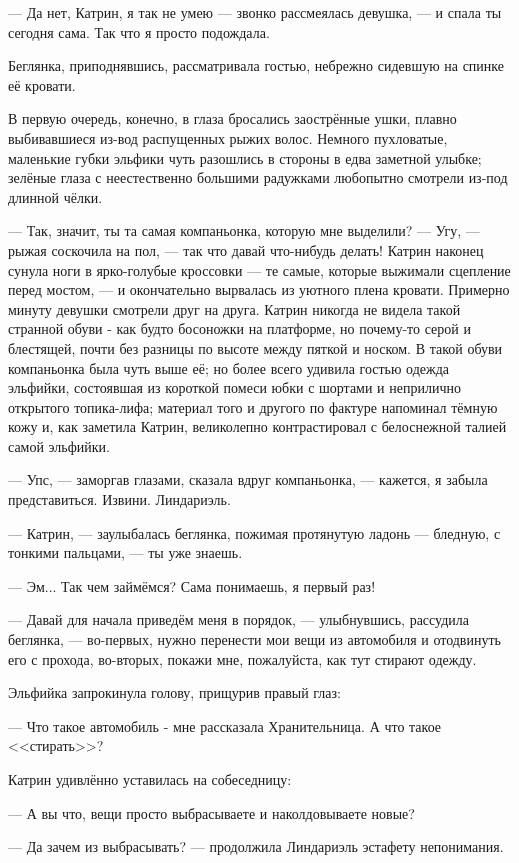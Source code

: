 --- Да нет, Катрин, я так не умею --- звонко рассмеялась девушка, --- и спала ты сегодня сама. Так что я просто подождала.

Беглянка, приподнявшись, рассматривала гостью, небрежно сидевшую на спинке её кровати.

В первую очередь, конечно, в глаза бросались заострённые ушки, плавно выбивавшиеся из-вод распущенных рыжих волос.
Немного пухловатые, маленькие губки эльфики чуть разошлись в стороны в едва заметной улыбке;
зелёные глаза с неестественно большими радужками любопытно смотрели из-под длинной чёлки.

--- Так, значит, ты та самая компаньонка, которую мне выделили?
--- Угу, --- рыжая соскочила на пол, --- так что давай что-нибудь делать!
Катрин наконец сунула ноги в ярко-голубые кроссовки --- те самые, которые выжимали сцепление перед мостом, ---
и окончательно вырвалась из уютного плена кровати. Примерно минуту девушки смотрели друг на друга.
Катрин никогда не видела такой странной обуви - как будто босоножки на платформе, но почему-то серой и блестящей,
почти без разницы по высоте между пяткой и носком. В такой обуви компаньонка была чуть выше её;
но более всего удивила гостью одежда эльфийки, состоявшая из короткой помеси юбки с шортами и неприлично открытого топика-лифа;
материал того и другого по фактуре напоминал тёмную кожу и, как заметила Катрин,
великолепно контрастировал с белоснежной талией самой эльфийки.

--- Упс, --- заморгав глазами, сказала вдруг компаньонка, --- кажется, я забыла представиться. Извини. Линдариэль.

--- Катрин, --- заулыбалась беглянка, пожимая протянутую ладонь --- бледную, с тонкими пальцами, --- ты уже знаешь.

--- Эм... Так чем займёмся? Сама понимаешь, я первый раз!


--- Давай для начала приведём меня в порядок, --- улыбнувшись, рассудила беглянка, ---
во-первых, нужно перенести мои вещи из автомобиля и отодвинуть его с прохода, во-вторых, покажи мне, пожалуйста,
как тут стирают одежду.

Эльфийка запрокинула голову, прищурив правый глаз:

--- Что такое автомобиль - мне рассказала Хранительница. А что такое <<стирать>>?

Катрин удивлённо уставилась на собеседницу:

--- А вы что, вещи просто выбрасываете и наколдовываете новые?

--- Да зачем из выбрасывать? --- продолжила Линдариэль эстафету непонимания.

